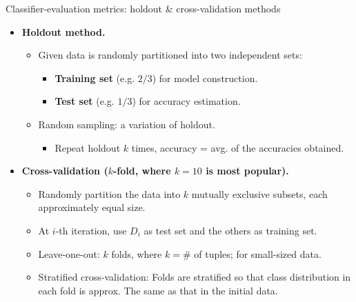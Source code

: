 \documentclass[aspectratio=169,t,table]{beamer}
\begin{document}
  {
    \begin{frame}{Classifier-evaluation metrics: holdout \& cross-validation methods}
      \begin{itemize}
        \item \textbf{Holdout method.}
        \begin{itemize}
          \item Given data is randomly partitioned into two independent sets:
          \begin{itemize}
            \item \textbf{\color{airforceblue}Training set} (e.g. $2/3$) for model construction.
            \item \textbf{\color{airforceblue}Test set} (e.g. $1/3$) for accuracy estimation.
          \end{itemize}
          \item Random sampling: a variation of holdout.
          \begin{itemize}
            \item Repeat holdout $k$ times, accuracy = avg. of the accuracies obtained.
          \end{itemize}
        \end{itemize}
        \item \textbf{{\color{airforceblue}Cross-validation} ($k$-fold, where $k = 10$ is most popular).}
        \begin{itemize}
          \item Randomly partition the data into $k$ mutually exclusive subsets, each approximately equal size.
          \item At $i$-th iteration, use $D_i$ as test set and the others as training set.
          \item Leave-one-out: $k$ folds, where $k = \#$ of tuples; for small-sized data.
          \item Stratified cross-validation: Folds are stratified so that class distribution in each fold is approx. The same as that in the initial data.
        \end{itemize}
      \end{itemize}
    \end{frame}
  }
\end{document}

